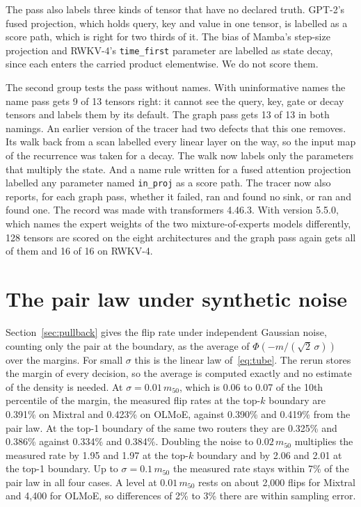 \documentclass[journal,onecolumn]{IEEEtran}
\begin{document}
The pass also labels three kinds of tensor that have no declared truth. GPT-2's fused projection,
which holds query, key and value in one tensor, is labelled as a score path, which is right for
two thirds of it. The bias of Mamba's step-size projection and RWKV-4's \texttt{time\_first}
parameter are labelled as state decay, since each enters the carried product elementwise. We do
not score them.

The second group tests the pass without names. With uninformative names the name pass gets 9 of
13 tensors right: it cannot see the query, key, gate or decay tensors and labels them by its
default. The graph pass gets 13 of 13 in both namings. An earlier version of the tracer had two
defects that this one removes. Its walk back from a scan labelled every linear layer on the way,
so the input map of the recurrence was taken for a decay. The walk now labels only the parameters
that multiply the state. And a name rule written for a fused attention projection labelled any
parameter named \texttt{in\_proj} as a score path. The tracer now also reports, for each graph
pass, whether it failed, ran and found no sink, or ran and found one. The record was made with
transformers 4.46.3. With version 5.5.0, which names the expert weights of the two
mixture-of-experts models differently, 128 tensors are scored on the eight architectures and the
graph pass again gets all of them and 16 of 16 on RWKV-4.

\section{The pair law under synthetic noise}\label{app:law}

Section~\ref{sec:pullback} gives the flip rate under independent
Gaussian noise, counting only the pair at the boundary, as the average of
$\Phi(-m/(\sqrt2\,\sigma))$ over the margins. For small $\sigma$ this is the linear law
of~\eqref{eq:tube}. The rerun stores the margin of every decision, so the average is computed
exactly and no estimate of the density is needed. At $\sigma = 0.01\,m_{50}$, which is 0.06 to
0.07 of the 10th percentile of the margin, the measured flip rates at the top-$k$ boundary are
0.391\% on Mixtral and 0.423\% on OLMoE, against 0.390\% and 0.419\% from the pair law. At the
top-1 boundary of the same two routers they are 0.325\% and 0.386\% against 0.334\% and 0.384\%.
Doubling the noise to $0.02\,m_{50}$ multiplies the measured rate by 1.95 and 1.97 at the
top-$k$ boundary and by 2.06 and 2.01 at the top-1 boundary. Up to $\sigma = 0.1\,m_{50}$ the
measured rate stays within 7\% of the pair law in all four cases. A level at
$0.01\,m_{50}$ rests on about 2{,}000 flips for Mixtral and 4{,}400 for OLMoE, so differences of
2\% to 3\% there are within sampling error.
\end{document}
